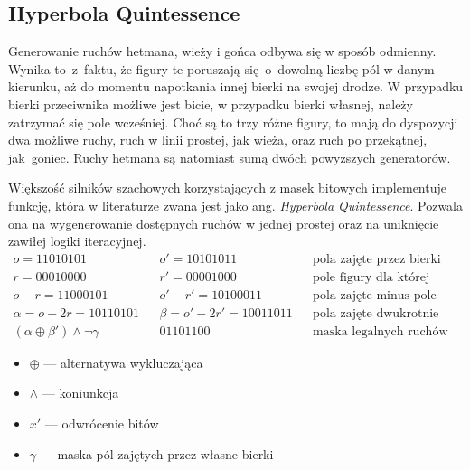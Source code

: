 \subsection{Hyperbola Quintessence}
\label{subsec:hyperbola-quintessence}

Generowanie ruchów hetmana, wieży i gońca odbywa się w sposób odmienny.
Wynika to~z~faktu, że figury te poruszają się~o~dowolną liczbę pól w danym kierunku, aż do momentu napotkania innej bierki na swojej drodze.
W przypadku bierki przeciwnika możliwe jest bicie, w przypadku bierki własnej, należy zatrzymać się pole wcześniej.
Choć są to trzy różne figury, to mają do dyspozycji dwa możliwe ruchy, ruch w linii prostej, jak wieża, oraz ruch po przekątnej, jak~goniec.
Ruchy hetmana są natomiast sumą dwóch powyższych generatorów.

Większość silników szachowych korzystających z masek bitowych implementuje funkcję, która w literaturze zwana jest jako ang. \emph{Hyperbola Quintessence}.
Pozwala ona na wygenerowanie dostępnych ruchów w jednej prostej oraz na uniknięcie zawiłej logiki iteracyjnej.
\begin{align*}
    o = \text{11010101} && o' = \text{10101011} && \text{pola zajęte przez bierki} \\
    r = \text{00010000} && r' = \text{00001000} && \text{pole figury dla której generujemy ruchy} \\
    o-r = \text{11000101} && o'-r' = \text{10100011} && \text{pola zajęte minus pole figury} \\
    \alpha = o-2r = \text{10110101} && \beta = o'-2r' = \text{10011011} && \text{pola zajęte dwukrotnie minus pole figury} \\
    (\alpha \oplus \beta') \wedge \neg \gamma && \text{01101100} && \text{maska legalnych ruchów}
\end{align*}
\begin{multicols}{2}
    \begin{itemize}[label={}]
        \item \(\oplus\) — alternatywa wykluczająca
        \item \(\wedge\) — koniunkcja
        \item \(x'\) — odwrócenie bitów
        \item \(\gamma\) — maska pól zajętych przez własne bierki
    \end{itemize}
\end{multicols}




